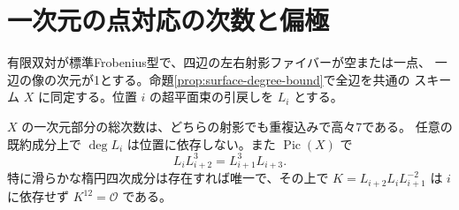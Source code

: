 \section{一次元の点対応の次数と偏極}
\label{sec:point-graph-curves}
有限双対が標準Frobenius型で、四辺の左右射影ファイバーが空または一点、
一辺の像の次元が1とする。命題\ref{prop:surface-degree-bound}で全辺を共通の
スキーム $X$ に同定する。位置 $i$ の超平面束の引戻しを $L_i$ とする。
\begin{theorem}\label{thm:point-graph-curve-degree}
$X$ の一次元部分の総次数は、どちらの射影でも重複込みで高々7である。
任意の既約成分上で $\deg L_i$ は位置に依存しない。また $\operatorname{Pic}(X)$ で
\[
 L_i L_{i+2}^3=L_{i+1}^3 L_{i+3}.
\]
特に滑らかな楕円四次成分は存在すれば唯一で、その上で
$K=L_{i+2}L_i L_{i+1}^{-2}$ は $i$ に依存せず $K^{12}=\mathcal O$ である。
\end{theorem}
